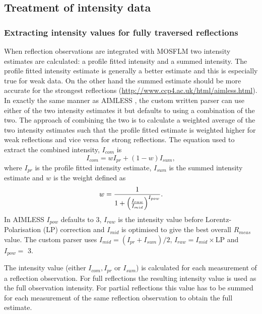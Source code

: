 \subsection{Treatment of intensity data}
\label{sub:Treatment of intensity data}

\subsubsection{Extracting intensity values for fully traversed reflections}
\label{subs:Extracting intensity values for fully traversed reflections}
When reflection observations are integrated with MOSFLM two intensity estimates are calculated: a profile fitted intensity and a summed intensity.
The profile fitted intensity estimate is generally a better estimate and this is especially true for weak data.
On the other hand the summed estimate should be more accurate for the strongest reflections (\url{http://www.ccp4.ac.uk/html/aimless.html}).
In exactly the same manner as AIMLESS \cite{evans2013}, the custom written parser can use either of the two intensity estimates it but defaults to using a combination of the two.
The approach of combining the two is to calculate a weighted average of the two intensity estimates such that the profile fitted estimate is weighted higher for weak reflections and vice versa for strong reflections.
The equation used to extract the combined intensity, $I_{com}$ is
\begin{equation}
    I_{com} = wI_{pr} + (1-w)I_{sum},
\end{equation}
where $I_{pr}$ is the profile fitted intensity estimate, $I_{sum}$ is the summed intensity estimate and $w$ is the weight defined as
\begin{equation}
    w = \frac{1}{1 + \left(\frac{I_{raw}}{I_{mid}}\right)^{I_{pow}}}.
\end{equation}
In AIMLESS $I_{pow}$ defaults to 3, $I_{raw}$ is the intensity value before Lorentz-Polarisation (LP) correction and $I_{mid}$ is optimised to give the best overall $R_{meas}$ value.
The custom parser uses $I_{mid} = (I_{pr} + I_{sum})/2$, $I_{raw} = I_{mid} \times $LP and $I_{pow} =$ 3.

The intensity value (either $I_{com}, I_{pr}$ or $I_{sum}$) is calculated for each measurement of a reflection observation.
For full reflections the resulting intensity value is used as the full observation intensity.
For partial reflections this value has to be summed for each measurement of the same reflection observation to obtain the full estimate.

